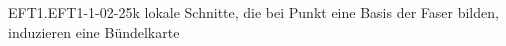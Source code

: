 \begin{REM}{EFT1.EFT1-1-02-25}{k lokale Schnitte, die bei Punkt eine Basis der Faser bilden, induzieren eine Bündelkarte}

\end{REM}
